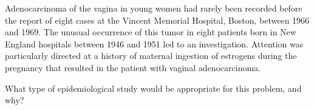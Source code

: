 
Adenocarcinoma of the vagina in young women had rarely been recorded
before the report of eight cases at the Vincent Memorial Hospital,
Boston, between 1966 and 1969.  The unusual occurrence of this tumor
in eight patients born in New England hospitals between 1946 and 1951
led to an investigation.  Attention was particularly directed at a
history of maternal ingestion of estrogens during the pregnancy that
resulted in the patient with vaginal adenocarcinoma.

What type of epidemiological study would be appropriate for this
problem, and why?


